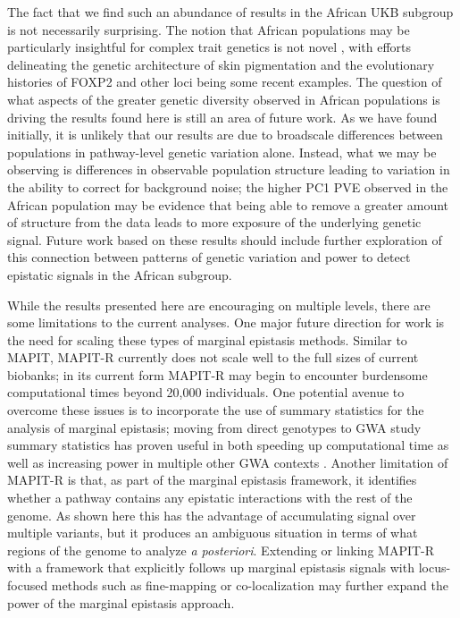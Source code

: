 \documentclass[12pt,a4paper]{article}
\begin{document}
The fact that we find such an abundance of results in the African UKB subgroup is not necessarily surprising. The notion that African populations may be particularly insightful for complex trait genetics is not novel \citep{Rotimi2017,Choudhury2018,Martin2018,Bentley2020}, with efforts delineating the genetic architecture of skin pigmentation \citep{Martin2017b,Crawford2017b} and the evolutionary histories of FOXP2 and other loci \citep{Atkinson2018,Sugden2018} being some recent examples. The question of what aspects of the greater genetic diversity observed in African populations is driving the results found here is still an area of future work. As we have found initially, it is unlikely that our results are due to broadscale differences between populations in pathway-level genetic variation alone. Instead, what we may be observing is differences in observable population structure leading to variation in the ability to correct for background noise; the higher PC1 PVE observed in the African population may be evidence that being able to remove a greater amount of structure from the data leads to more exposure of the underlying genetic signal. Future work based on these results should include further exploration of this connection between patterns of genetic variation and power to detect epistatic signals in the African subgroup.  

While the results presented here are encouraging on multiple levels, there are some limitations to the current analyses. One major future direction for work is the need for scaling these types of marginal epistasis methods. Similar to MAPIT, MAPIT-R currently does not scale well to the full sizes of current biobanks; in its current form MAPIT-R may begin to encounter burdensome computational times beyond 20,000 individuals. One potential avenue to overcome these issues is to incorporate the use of summary statistics for the analysis of marginal epistasis; moving from direct genotypes to GWA study summary statistics has proven useful in both speeding up computational time as well as increasing power in multiple other GWA contexts \citep{Shi2016,Johnson2018,Ray2018,Cheng2019,Turchin2019,Urbut2019}. Another limitation of MAPIT-R is that, as part of the marginal epistasis framework, it identifies whether a pathway contains any epistatic interactions with the rest of the genome. As shown here this has the advantage of accumulating signal over multiple variants, but it produces an ambiguous situation in terms of what regions of the genome to analyze \textit{a posteriori}. Extending or linking MAPIT-R with a framework that explicitly follows up marginal epistasis signals with locus-focused methods such as fine-mapping \citep{Kichaev2014,Chen2015,Benner2016} or co-localization \citep{Hormozdiari2016,Zhu2016,Wen2017,Giambartolomei2018,Wallace2020} may further expand the power of the marginal epistasis approach.  
\end{document}
